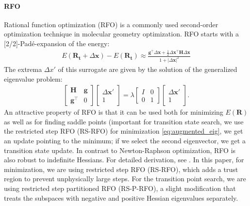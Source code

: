 \documentclass[pdflatex,sn-mathphys-num]{sn-jnl}%
\theoremstyle{thmstyleone}%
\theoremstyle{thmstyletwo}%
\theoremstyle{thmstylethree}%
\begin{document}
\begin{appendices}
\paragraph{RFO \label{sec:rfo_background}}
Rational function optimization (RFO) \citep{simons1983,banerjee1985} is a commonly used second-order optimization technique in molecular geometry optimization. RFO starts with a [2/2]-Pad\'e-expansion of the energy:
\begin{align}
    E(\mathbf{R_t} + \Delta \mathbf{x}) - E(\mathbf{R_t}) \approx \frac{\mathbf{g}^\top \Delta \mathbf{x} + \frac{1}{2} \Delta \mathbf{x}^\top \mathbf{H} \Delta \mathbf{x}}{1 + |\Delta\mathbf{x}|^2 }
\end{align}
The extrema $\Delta x'$ of this surrogate are given by the solution of the generalized eigenvalue problem:
\begin{align}
\begin{bmatrix}
    \mathbf{H} & \mathbf{g} \\
    \mathbf{g}^\top & 0
\end{bmatrix}
\begin{bmatrix}
    \Delta \mathbf{x}' \\
    1
\end{bmatrix}
=
\lambda
\begin{bmatrix}
    I & 0 \\
    0 & 1
\end{bmatrix}
\begin{bmatrix}
    \Delta \mathbf{x}' \\
    1
\end{bmatrix}. \label{eq:augmented_eig}
\end{align}
An attractive property of RFO is that it can be used both for minimizing $E(\mathbf{R})$ as well as for finding saddle points (important for transition state search, we use the restricted step RFO (RS-RFO) for minimization \ref{eq:augmented_eig}, we get an update pointing to the minimum; if we select the second eigenvector, we get a transition state update. In contrast to Newton-Raphson optimization, RFO is also robust to indefinite Hessians. For detailed derivation, see \citep{simons1983, banerjee1985}. In this paper, for minimization, we are using restricted step RFO (RS-RFO), which adds a trust region to prevent unphysically large steps. For the transition point search, we are using restricted step partitioned RFO (RS-P-RFO), a slight modification that treats the subspaces with negative and positive Hessian eigenvalues separately.


\end{appendices}
\end{document}
